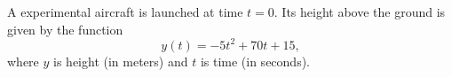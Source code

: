 \documentclass[addpoints, 12pt]{exam}
\begin{document}
\begin{questions}

\newpage 

\question[10]
A experimental aircraft is launched at time $t=0$.  Its height above the ground is given by the function \begin{equation*}
	y(t) = -5t^2 + 70t + 15 ,
\end{equation*}
where $y$ is height (in meters) and $t$ is time (in seconds).

\end{questions}
\end{document}
